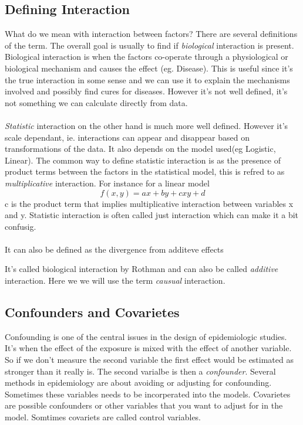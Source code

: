 \documentclass[10pt,a4paper]{article}
\begin{document}
\subsection{Defining Interaction}
What do we mean with interaction between factors? There are several definitions of the term\cite{rothman2002intro_epidemiology}. The overall goal is usually to find if \emph{biological} interaction is present. Biological interaction is when the factors co-operate through a physiological or biological mechanism and causes the effect (eg. Disease). This is useful since it's the true interaction in some sense and we can use it to explain the mechanisms involved and possibly find cures for diseases. However it's not well defined, it's not something we can calculate directly from data.\cite{rothman1998modern,rothman2002intro_epidemiology}\\
\\
\emph{Statistic} interaction on the other hand is much more well defined. However it's scale dependant, ie. interactions can appear and disappear based on transformations of the data. It also depends on the model used(eg Logistic, Linear). The common way to define statistic interaction is as the presence of product terms between the factors in the statistical model, this is refred to as \emph{multiplicative} interaction. For instance for a linear model
$$f(x,y)=ax+by+cxy+d$$
c is the product term that implies multiplicative interaction between variables x and y. Statistic interaction is often called just interaction which can make it a  bit confusig.\cite{geira,rothman1998modern}\\
\\
It can also be defined as the divergence from additeve effects

It's called biological interaction by Rothman\cite{} and can also be called \emph{additive} interaction\cite{geira}. Here we we will use the term \emph{causual} interaction.\\


\subsection{Confounders and Covarietes}
Confounding is one of the central issues in the design of epidemiologic studies. It's when the effect of the exposure is mixed with the effect of another variable. So if we don't measure the second variable the first effect would be estimated as stronger than it really is. The second varialbe is then a \emph{confounder}. Several methods in epidemiology are about avoiding or adjusting for confounding. Sometimes these variables needs to be incorperated into the models. Covarietes are possible confounders or other variables that you want to adjust for in the model. Somtimes covariets are called control variables.\cite{rothman2002intro_epidemiology,rothman1998modern}
\end{document}

